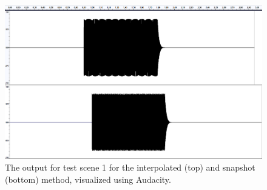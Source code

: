\begin{figure}[t!]
    \begin{center}
        \includegraphics{images/approach-waves.png}
    \end{center}
    \caption{The output for test scene 1 for the interpolated (top) and snapshot (bottom) method, visualized using Audacity.}\label{fig:ApproachWaves}
\end{figure}

